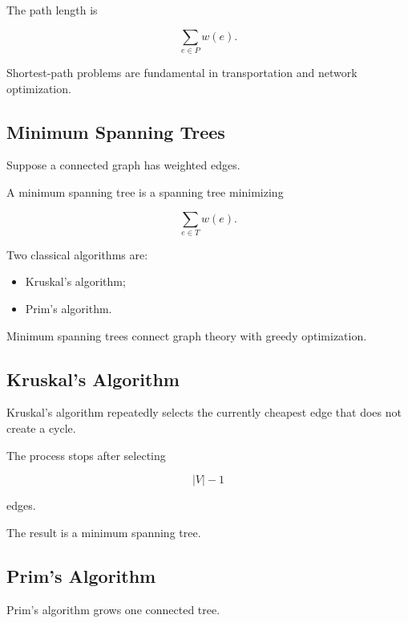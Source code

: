 The path length is

\[
\boxed{
\sum_{e\in P}w(e).
}
\]

Shortest-path problems are fundamental in transportation and network
optimization.

\subsection{Minimum Spanning Trees}
\label{subsec:minimum-spanning-trees}

Suppose a connected graph has weighted edges.

A minimum spanning tree is a spanning tree minimizing

\[
\boxed{
\sum_{e\in T}w(e).
}
\]

Two classical algorithms are:

\begin{itemize}
    \item Kruskal's algorithm;
    \item Prim's algorithm.
\end{itemize}

Minimum spanning trees connect graph theory with greedy optimization.

\subsection{Kruskal's Algorithm}
\label{subsec:kruskals-algorithm}

Kruskal's algorithm repeatedly selects the currently cheapest edge that
does not create a cycle.

The process stops after selecting

\[
|V|-1
\]

edges.

The result is a minimum spanning tree.

\subsection{Prim's Algorithm}
\label{subsec:prims-algorithm}

Prim's algorithm grows one connected tree.

